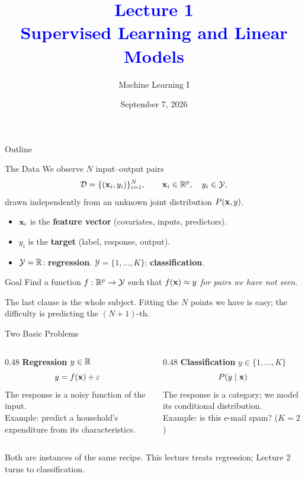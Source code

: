 \documentclass[11pt,aspectratio=169]{beamer}
\title{\textcolor{blue}{Lecture 1 \\ Supervised Learning and Linear Models}}
\subtitle{Machine Learning I}
\date{September 7, 2026}
\begin{document}
\begin{frame}[plain]
\maketitle
\end{frame}

\begin{frame}{Outline}
\tableofcontents
\end{frame}


\begin{frame}{The Data}
We observe $N$ input--output pairs
\[
\mathcal{D}=\{(\mathbf{x}_i,y_i)\}_{i=1}^N,\qquad \mathbf{x}_i\in\mathbb{R}^p,\quad y_i\in\mathcal{Y},
\]
drawn independently from an unknown joint distribution $P(\mathbf{x},y)$.
\begin{itemize}
  \item $\mathbf{x}_i$ is the \textbf{feature vector} (covariates, inputs, predictors).
  \item $y_i$ is the \textbf{target} (label, response, output).
  \item $\mathcal{Y}=\mathbb{R}$: \textbf{regression}. \quad $\mathcal{Y}=\{1,\dots,K\}$: \textbf{classification}.
\end{itemize}
\begin{block}{Goal}
Find a function $f:\mathbb{R}^p\to\mathcal{Y}$ such that $f(\mathbf{x})\approx y$ \emph{for pairs we have not seen}.
\end{block}
\begin{keypoint}
The last clause is the whole subject. Fitting the $N$ points we have is easy; the difficulty is
predicting the $(N{+}1)$-th.
\end{keypoint}
\end{frame}

\begin{frame}{Two Basic Problems}
\begin{columns}[T]
\begin{column}{0.48\textwidth}
\textbf{Regression} \quad $y\in\mathbb{R}$
\[
y = f(\mathbf{x})+\varepsilon
\]
The response is a noisy function of the input. \\[4pt]
Example: predict a household's expenditure from its characteristics.
\end{column}
\begin{column}{0.48\textwidth}
\textbf{Classification} \quad $y\in\{1,\dots,K\}$
\[
P(y\mid\mathbf{x})
\]
The response is a category; we model its conditional distribution. \\[4pt]
Example: is this e-mail spam? ($K=2$)
\end{column}
\end{columns}
\vspace{8pt}
Both are instances of the same recipe. This lecture treats regression; Lecture 2 turns to classification.
\end{frame}
\end{document}
